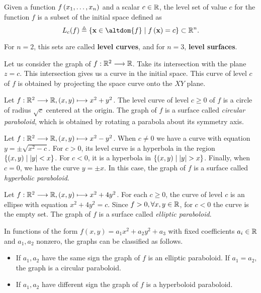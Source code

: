 \begin{defn}
Given a function $f\left(x_1, \ldots, x_n\right)$ and a scalar $c\in\R$, the level set of value $c$ for the function $f$ is a subset of the initial space
defined as
\begin{equation}
\levelset{c}{f} \bydef \{\vec{x}\in\altdom{f}\st f\left(\vec{x}\right) = c\}\subset\Rtn.
\end{equation}
\end{defn}

\begin{note}
    For $n=2$, this sets are called \textbf{level curves}, and for $n=3$, \textbf{level surfaces}.
\end{note}

Let us consider the graph of $\appl{f}{\R^2}{\R}$. Take its intersection with the plane $z = c$. This intersection gives 
us a curve in the initial space. This curve of level $c$ of $f$ is obtained by projecting the space curve onto the $XY$
plane.

\begin{example}
    Let $\appl{f}{\R^2}{\R}, (x, y)\longmapsto x^2 + y^2$. The level curve of level $c\geq 0$ of $f$ is a circle of radius
    $\sqrt{c}$ centered at the origin. The graph of $f$ is a surface called \textit{circular paraboloid}, which is obtained
    by rotating a parabola about its symmetry axis.
\end{example}

\begin{example}
    Let $\appl{f}{\R^2}{\R}, (x, y)\longmapsto x^2 - y^2$. When $c\neq 0$ we have a curve with equation $y = \pm\sqrt{x^2 - c}$.
    For $c > 0$, its level curve is a hyperbola in the region $\{(x, y)\; | \; \abs{y} < x\}$. For $c < 0$, it is a hyperbola in
    $\{(x, y)\; | \;\abs{y} > x\}$. Finally, when $c = 0$, we have the curve $y = \pm x$. In this case, the graph of $f$ is a 
    surface called \textit{hyperbolic paraboloid}.
\end{example}

\begin{example}
    Let $\appl{f}{\R^2}{\R}, (x, y)\longmapsto x^2 + 4y^2$. For each $c\geq 0$, the curve of level $c$ is an ellipse with
    equation $x^2 + 4y^2 = c$. Since $f > 0, \forall x, y\in\R$, for $c < 0$ the curve is the empty set. The graph of $f$ is
    a surface called \textit{elliptic paraboloid}.
\end{example}

\begin{remark}
    In functions of the form $f(x, y) = a_1x^2 + a_2y^2 + a_3$ with fixed coefficients $a_i\in\R$ and $a_1, a_2$ nonzero, the
    graphs can be classified as follows.
    \begin{itemize}[itemsep = -2pt]
        \item If $a_1, a_2$ have the same sign the graph of $f$ is an elliptic paraboloid. If $a_1 = a_2$, the graph is a 
            circular paraboloid.
        \item If $a_1, a_2$ have different sign the graph of $f$ is a hyperboloid paraboloid.
    \end{itemize}
\end{remark}

